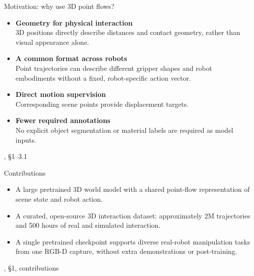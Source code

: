 \documentclass[aspectratio=169,12pt]{beamer}
\newcommand{\credit}[1]{\par\hfill{\tiny\color{mute}\citet{huang2026pointworld}, #1}\par}
\newcommand{\pw}[1]{{\color{pw}#1}}
\begin{document}
\begin{frame}[t]{Motivation: why use 3D point flows?}
  \vspace{-0.2cm}
  \footnotesize
  \begin{itemize}\setlength{\itemsep}{12pt}
    \item<1-> \textbf{\color{pw}Geometry for physical interaction}\\
      3D positions directly describe distances and contact geometry,
      rather than visual appearance alone.

    \item<2-> \textbf{\color{pw}A common format across robots}\\
      Point trajectories can describe different gripper shapes and
      robot embodiments without a fixed, robot-specific action vector.

    \item<3-> \textbf{\color{pw}Direct motion supervision}\\
      Corresponding scene points provide displacement targets.

    \item<4-> \textbf{\color{pw}Fewer required annotations}\\
      No explicit object segmentation or material labels are required
      as model inputs.
  \end{itemize}
  \vfill
  \credit{\S1--3.1}
\end{frame}



\begin{frame}{Contributions}
  \vfill
  \begin{itemize}\setlength{\itemsep}{16pt}
    \item<1-> A large pretrained \pw{3D world model} with a shared point-flow representation of scene state and robot action.
    \item<2-> A curated, open-source 3D interaction dataset: approximately \pw{2M trajectories and 500 hours} of real and simulated interaction.
    \item<3-> A \pw{single pretrained checkpoint} supports diverse real-robot manipulation tasks from one RGB-D capture, without extra demonstrations or post-training.
  \end{itemize}
  \vfill
  \credit{\S1, contributions}
\end{frame}
\end{document}
